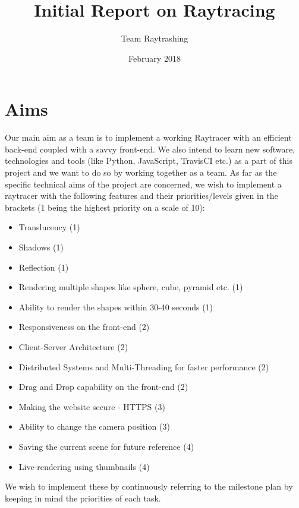\title{Initial Report on Raytracing}
\author{Team Raytrashing}
\date{February 2018}

\maketitle

\section{Aims}
Our main aim as a team is to implement a working Raytracer with an efficient back-end coupled with a savvy front-end. We also intend to learn new software, technologies and tools (like Python, JavaScript, TravisCI etc.) as a part of this project and we want to do so by working together as a team. 
As far as the specific technical aims of the project are concerned, we wish to implement a raytracer with the following features and their priorities/levels given in the brackets (1 being the highest priority on a scale of 10):
\begin{itemize}
    \item Translucency (1)
    \item Shadows (1)
    \item Reflection (1)
    \item Rendering multiple shapes like sphere, cube, pyramid etc. (1)
    \item Ability to render the shapes within 30-40 seconds (1)
    \item Responsiveness on the front-end (2)
    \item Client-Server Architecture (2)
    \item Distributed Systems and Multi-Threading for faster performance (2)
    \item Drag and Drop capability on the front-end (2)
    \item Making the website secure - HTTPS (3)
    \item Ability to change the camera position (3)
    \item Saving the current scene for future reference (4)
    \item Live-rendering using thumbnails (4)
\end{itemize}
We wish to implement these by continuously referring to the milestone plan by keeping in mind the priorities of each task.


